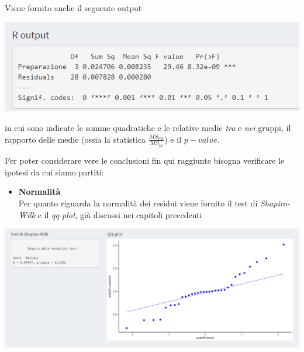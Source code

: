 \documentclass[
  11pt,
]{book}
\providecommand{\tightlist}{%
  \setlength{\itemsep}{0pt}\setlength{\parskip}{0pt}}
\begin{document}
Viene fornito anche il seguente output

\begin{center}\includegraphics[width=0.5\linewidth]{Immagini/Anova/05_anova2} \end{center}

in cui sono indicate le somme quadratiche e le relative medie \emph{tra} e \emph{nei} gruppi, il rapporto delle medie (ossia la statistica \(\frac{MS_{tra}}{MS_{in}}\)) e il \(p-value\).

Per poter considerare vere le conclusioni fin qui raggiunte bisogna verificare le ipotesi da cui siamo partiti:

\begin{itemize}
\tightlist
\item
  \textbf{Normalità}\\
  Per quanto riguarda la normalità dei residui viene fornito il test di \emph{Shapiro-Wilk} e il \emph{qq-plot}, già discussi nei capitoli precedenti
\end{itemize}

\begin{center}\includegraphics[width=0.6\linewidth]{Immagini/Anova/06_normalita} \end{center}
\end{document}
